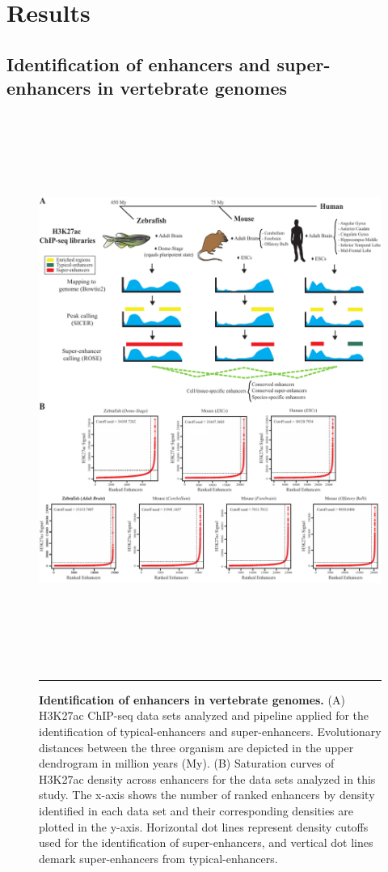 \section{Results}
	\subsection{Identification of enhancers and super-enhancers in vertebrate genomes}

		\begin{figure}[!h]
			\centering
			\includegraphics[width=16cm,height=18cm]{./figures/Figure_1.pdf}
  			\caption[Identification]{\textbf{Identification of enhancers in vertebrate genomes.} (A) H3K27ac ChIP-seq data sets analyzed and pipeline applied for the identification of typical-enhancers and super-enhancers. Evolutionary distances between the three organism are depicted in the upper dendrogram in million years (My). (B) Saturation curves of H3K27ac density across enhancers for the data sets analyzed in this study. The x-axis shows the number of ranked enhancers by density identified in each data set and their corresponding densities are plotted in the y-axis. Horizontal dot lines represent density cutoffs used for the identification of super-enhancers, and vertical dot lines demark super-enhancers from typical-enhancers.}
			\label{Identification}
			\rule{\textwidth}{0.25mm}
		\end{figure}

